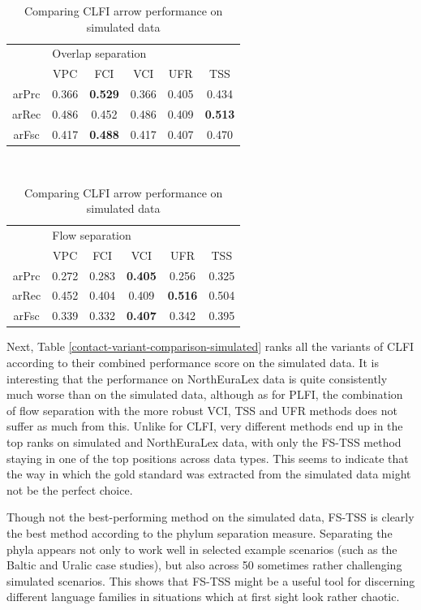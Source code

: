 \begin{table}
 \centering
 \begin{tabular}{cccccc}
  \hline \hline
   & \multicolumn{5}{l}{Overlap separation}\\ 
        &   VPC &   FCI &   VCI &   UFR &   TSS \\ \hline
  arPrc & 0.366 & \textbf{0.529} & 0.366 & 0.405 & 0.434\\
  arRec & 0.486 & 0.452 & 0.486 & 0.409 & \textbf{0.513}\\
  arFsc & 0.417 & \textbf{0.488} & 0.417 & 0.407 & 0.470\\
  \hline
 \end{tabular}\\[0.5cm]
  \begin{tabular}{cccccc}
  \hline \hline
   & \multicolumn{5}{l}{Flow separation}\\ 
        &   VPC &   FCI &   VCI &   UFR &   TSS\\ \hline
  arPrc &  0.272 & 0.283 & \textbf{0.405} & 0.256 & 0.325\\
  arRec & 0.452 & 0.404 & 0.409 & \textbf{0.516} & 0.504\\
  arFsc & 0.339 & 0.332 & \textbf{0.407} & 0.342 & 0.395\\
  \hline
 \end{tabular}
 \caption{Comparing CLFI arrow performance on simulated data}
 \label{contact-arrow-evaluation-simulated}
\end{table}

Next, Table \ref{contact-variant-comparison-simulated} ranks all the variants of CLFI according to their combined performance score on the simulated data. It is interesting that the performance on NorthEuraLex data is quite consistently much worse than on the simulated data, although as for PLFI, the combination of flow separation with the more robust VCI, TSS and UFR methods does not suffer as much from this. Unlike for CLFI, very different methods end up in the top ranks on simulated and NorthEuraLex data, with only the FS-TSS method staying in one of the top positions across data types. This seems to indicate that the way in which the gold standard was extracted from the simulated data might not be the perfect choice.

Though not the best-performing method on the simulated data, FS-TSS is clearly the best method according to the phylum separation measure. Separating the phyla appears not only to work well in selected example scenarios (such as the Baltic and Uralic case studies), but also across 50 sometimes rather challenging simulated scenarios. This shows that FS-TSS might be a useful tool for discerning different language families in situations which at first sight look rather chaotic.

